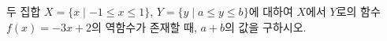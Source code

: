 두 집합 $X=\{x \mid -1\le x\le 1\}$, $Y=\{y \mid a\le y\le b\}$에 대하여 $X$에서 $Y$로의 함수 $f(x)=-3x+2$의 역함수가 존재할 때, $a+b$의 값을 구하시오. 
